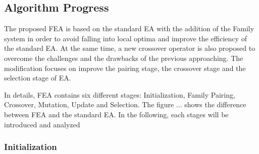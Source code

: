 \documentclass[final]{elsarticle}
\begin{document}


\subsection{Algorithm Progress}

The proposed FEA is based on the standard EA with the addition of the Family system in order to avoid falling into local optima and improve the efficiency of the standard EA. At the same time, a new crossover operator is also proposed to overcome the challenges and the drawbacks of the previous approaching. The modification focuses on improve the pairing stage, the crossover stage and the selection stage of EA. 

In details, FEA contains six different stages: Initialization, Family Pairing, Crossover, Mutation, Update and Selection. The figure ... shows the difference between FEA and the standard EA. In the following, each stages will be introduced and analyzed

\subsubsection{Initialization}
\end{document}
